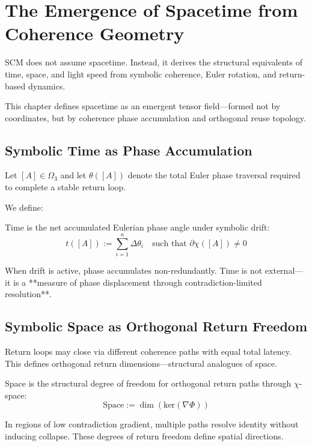 \chapter{The Emergence of Spacetime from Coherence Geometry} \label{chapter:spacetime-geometry}

SCM does not assume spacetime. Instead, it derives the structural equivalents of time, space, and light speed from symbolic coherence, Euler rotation, and return-based dynamics.

This chapter defines spacetime as an emergent tensor field—formed not by coordinates, but by coherence phase accumulation and orthogonal reuse topology.

\section{Symbolic Time as Phase Accumulation}

Let $[A] \in \Omega_3$ and let $\theta([A])$ denote the total Euler phase traversal required to complete a stable return loop.

We define:

\begin{definition}
Time is the net accumulated Eulerian phase angle under symbolic drift:
\[
t([A]) := \sum_{i=1}^{n} \Delta \theta_i \quad \text{such that } \partial \chi([A]) \ne 0
\]
\end{definition}

When drift is active, phase accumulates non-redundantly. Time is not external—it is a **measure of phase displacement through contradiction-limited resolution**.

\section{Symbolic Space as Orthogonal Return Freedom}

Return loops may close via different coherence paths with equal total latency. This defines orthogonal return dimensions—structural analogues of space.

\begin{definition}
Space is the structural degree of freedom for orthogonal return paths through $\chi$-space:
\[
\text{Space} := \dim\left(\text{ker}(\nabla \Phi)\right)
\]
\end{definition}

In regions of low contradiction gradient, multiple paths resolve identity without inducing collapse. These degrees of return freedom define spatial directions.

